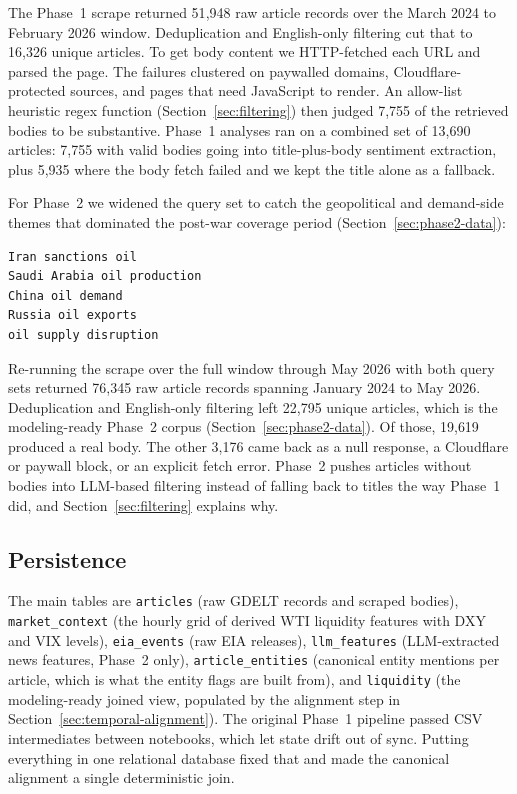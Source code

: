 The Phase~1 scrape returned 51{,}948 raw article records over the March 2024 to February 2026 window. Deduplication and English-only filtering cut that to 16{,}326 unique articles. To get body content we HTTP-fetched each URL and parsed the page. The failures clustered on paywalled domains, Cloudflare-protected sources, and pages that need JavaScript to render. An allow-list heuristic regex function (Section~\ref{sec:filtering}) then judged 7{,}755 of the retrieved bodies to be substantive. Phase~1 analyses ran on a combined set of 13{,}690 articles: 7{,}755 with valid bodies going into title-plus-body sentiment extraction, plus 5{,}935 where the body fetch failed and we kept the title alone as a fallback.

For Phase~2 we widened the query set to catch the geopolitical and demand-side themes that dominated the post-war coverage period (Section~\ref{sec:phase2-data}):

\begin{lstlisting}
Iran sanctions oil
Saudi Arabia oil production
China oil demand
Russia oil exports
oil supply disruption
\end{lstlisting}

Re-running the scrape over the full window through May 2026 with both query sets returned 76{,}345 raw article records spanning January 2024 to May 2026. Deduplication and English-only filtering left 22{,}795 unique articles, which is the modeling-ready Phase~2 corpus (Section~\ref{sec:phase2-data}). Of those, 19{,}619 produced a real body. The other 3{,}176 came back as a null response, a Cloudflare or paywall block, or an explicit fetch error. Phase~2 pushes articles without bodies into LLM-based filtering instead of falling back to titles the way Phase~1 did, and Section~\ref{sec:filtering} explains why.

\subsection{Persistence}\label{sec:persistence}

The main tables are \texttt{articles} (raw GDELT records and scraped bodies), \texttt{market\_context} (the hourly grid of derived WTI liquidity features with DXY and VIX levels), \texttt{eia\_events} (raw EIA releases), \texttt{llm\_features} (LLM-extracted news features, Phase~2 only), \texttt{article\_entities} (canonical entity mentions per article, which is what the entity flags are built from), and \texttt{liquidity} (the modeling-ready joined view, populated by the alignment step in Section~\ref{sec:temporal-alignment}). The original Phase~1 pipeline passed CSV intermediates between notebooks, which let state drift out of sync. Putting everything in one relational database fixed that and made the canonical alignment a single deterministic join.

